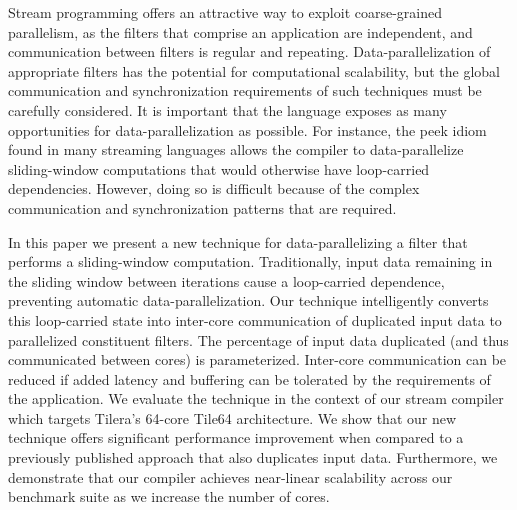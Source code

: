 Stream programming offers an attractive way to exploit coarse-grained
parallelism, as the filters that comprise an application are
independent, and communication between filters is regular and
repeating. Data-parallelization of appropriate filters has the
potential for computational scalability, but the global communication
and synchronization requirements of such techniques must be carefully
considered.  It is important that the language exposes as many
opportunities for data-parallelization as possible. For instance, the
peek idiom found in many streaming languages allows the compiler to
data-parallelize sliding-window computations that would otherwise have
loop-carried dependencies.  However, doing so is difficult because of
the complex communication and synchronization patterns that are
required.

In this paper we present a new technique for data-parallelizing a
filter that performs a sliding-window computation. Traditionally,
input data remaining in the sliding window between iterations cause a
loop-carried dependence, preventing automatic
data-parallelization. Our technique intelligently converts this
loop-carried state into inter-core communication of duplicated input
data to parallelized constituent filters. The percentage of input data
duplicated (and thus communicated between cores) is parameterized.
Inter-core communication can be reduced if added latency and buffering
can be tolerated by the requirements of the application. We evaluate
the technique in the context of our stream compiler which targets
Tilera's 64-core Tile64 architecture.  We show that our new
technique offers significant performance improvement when compared to
a previously published approach that also duplicates input data.
Furthermore, we demonstrate that our compiler achieves near-linear
scalability across our benchmark suite as we increase the number of
cores.


